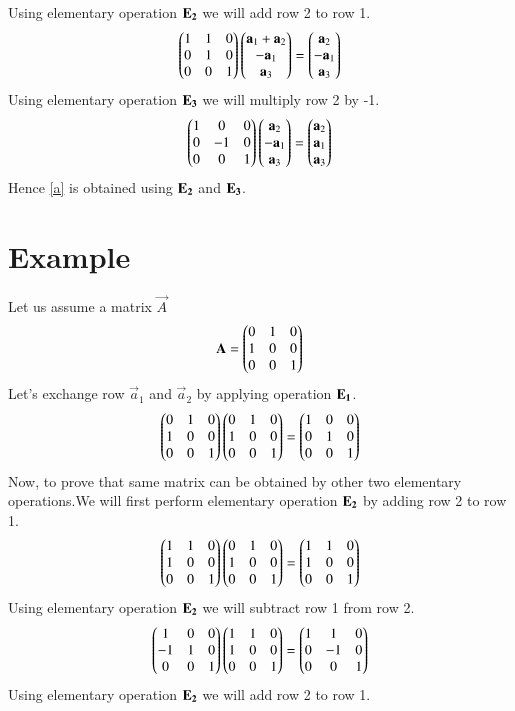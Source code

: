 \documentclass[journal,12pt,twocolumn]{IEEEtran}
\begin{document}
  Using elementary operation $\bf{E}_2$ we will add row 2 to row 1.
   \begin{align}
    \begin{pmatrix}1&1&0\\0&1&0\\0&0&1\end{pmatrix} \begin{pmatrix}\mathbf{a}_1+\mathbf{a}_2\\-\mathbf{a}_1\\\mathbf{a}_3\end{pmatrix}=
  \begin{pmatrix}\mathbf{a}_2\\-\mathbf{a}_1\\\mathbf{a}_3\end{pmatrix}
  \end{align}
  Using elementary operation $\bf{E}_3$ we will multiply row 2 by -1.
   \begin{align}
   \begin{pmatrix}1&0&0\\0&-1&0\\0&0&1\end{pmatrix}\begin{pmatrix}\mathbf{a}_2\\-\mathbf{a}_1\\\mathbf{a}_3\end{pmatrix}=
  \begin{pmatrix}\mathbf{a}_2\\\mathbf{a}_1\\\mathbf{a}_3\end{pmatrix}
  \end{align}
  Hence \eqref{a} is obtained using $\bf{E}_2$ and $\bf{E}_3$.
  \section{\textbf{Example}}
  Let us assume a matrix $\vec{A}$  
 \begin{align}
 \mathbf{A}=\begin{pmatrix}0&1&0\\1&0&0\\0&0&1\end{pmatrix}
  \end{align}
 Let's exchange row $\vec{a}_1$ and $\vec{a}_2$ by applying operation $\bf{E}_1$.
 \begin{align}
 \begin{pmatrix}0&1&0\\1&0&0\\0&0&1\end{pmatrix}\begin{pmatrix}0&1&0\\1&0&0\\0&0&1\end{pmatrix}=
\begin{pmatrix}1&0&0\\0&1&0\\0&0&1\end{pmatrix}\label{B}
 \end{align}
 Now, to prove that same matrix can be obtained by other two elementary operations.We will first perform elementary operation $\bf{E}_2$ by adding row 2 to row 1.
 \begin{align}
  \begin{pmatrix}1&1&0\\1&0&0\\0&0&1\end{pmatrix}\begin{pmatrix}0&1&0\\1&0&0\\0&0&1\end{pmatrix}=
\begin{pmatrix}1&1&0\\1&0&0\\0&0&1\end{pmatrix}
 \end{align}
 Using elementary operation $\bf{E}_2$ we will subtract row 1 from row 2.
  \begin{align}
   \begin{pmatrix}1&0&0\\-1&1&0\\0&0&1\end{pmatrix}\begin{pmatrix}1&1&0\\1&0&0\\0&0&1\end{pmatrix}=
 \begin{pmatrix}1&1&0\\0&-1&0\\0&0&1\end{pmatrix}
 \end{align}
 Using elementary operation $\bf{E}_2$ we will add row 2 to row 1.
   
\end{document}
